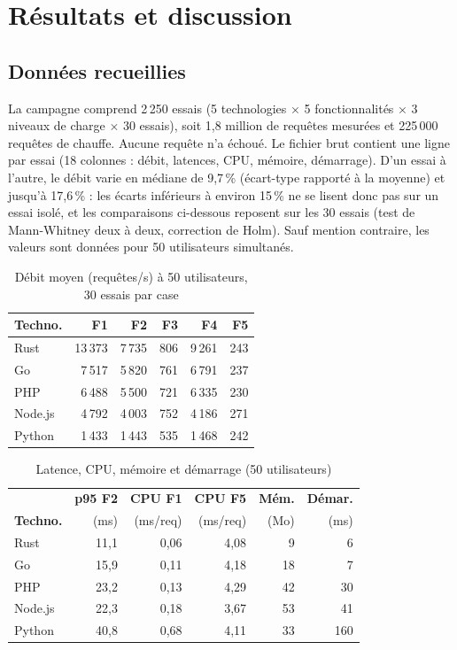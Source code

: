 \section{Résultats et discussion}\label{sec:res}
\subsection{Données recueillies}
La campagne comprend 2\,250 essais (5 technologies $\times$ 5 fonctionnalités $\times$ 3 niveaux de charge $\times$
30 essais), soit 1,8 million de requêtes mesurées et 225\,000 requêtes de chauffe. Aucune requête n'a échoué. Le
fichier brut contient une ligne par essai (18 colonnes : débit, latences, CPU, mémoire, démarrage). D'un essai à
l'autre, le débit varie en médiane de 9,7\,\% (écart-type rapporté à la moyenne) et jusqu'à 17,6\,\% : les écarts
inférieurs à environ 15\,\% ne se lisent donc pas sur un essai isolé, et les comparaisons ci-dessous reposent sur
les 30 essais (test de Mann-Whitney deux à deux, correction de Holm). Sauf mention contraire, les valeurs sont
données pour 50 utilisateurs simultanés.

\begin{table}[t]
\caption{Débit moyen (requêtes/s) à 50 utilisateurs, 30 essais par case}\label{tab:debit}
\centering\small
\begin{tabular}{@{}lrrrrr@{}}
\toprule
\textbf{Techno.} & \textbf{F1} & \textbf{F2} & \textbf{F3} & \textbf{F4} & \textbf{F5}\\
\midrule
Rust & 13\,373 & 7\,735 & 806 & 9\,261 & 243 \\
Go & 7\,517 & 5\,820 & 761 & 6\,791 & 237 \\
PHP & 6\,488 & 5\,500 & 721 & 6\,335 & 230 \\
Node.js & 4\,792 & 4\,003 & 752 & 4\,186 & 271 \\
Python & 1\,433 & 1\,443 & 535 & 1\,468 & 242 \\
\bottomrule
\end{tabular}
\end{table}

\begin{table}[t]
\caption{Latence, CPU, mémoire et démarrage (50 utilisateurs)}\label{tab:synth}
\centering\small
\setlength{\tabcolsep}{3.5pt}
\begin{tabular}{@{}lrrrrr@{}}
\toprule
 & \textbf{p95 F2} & \textbf{CPU F1} & \textbf{CPU F5} & \textbf{Mém.} & \textbf{Démar.}\\
\textbf{Techno.} & {\scriptsize(ms)} & {\scriptsize(ms/req)} & {\scriptsize(ms/req)} & {\scriptsize(Mo)} & {\scriptsize(ms)}\\
\midrule
Rust & 11,1 & 0,06 & 4,08 & 9 & 6 \\
Go & 15,9 & 0,11 & 4,18 & 18 & 7 \\
PHP & 23,2 & 0,13 & 4,29 & 42 & 30 \\
Node.js & 22,3 & 0,18 & 3,67 & 53 & 41 \\
Python & 40,8 & 0,68 & 4,11 & 33 & 160 \\
\bottomrule
\end{tabular}
\end{table}

